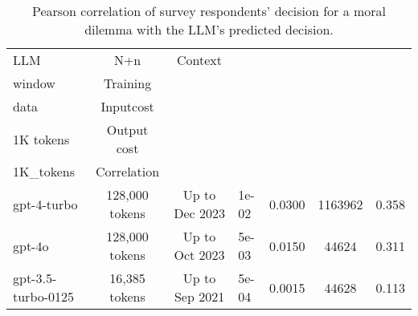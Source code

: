 \begin{table}[!h]
\centering
\caption{\label{tab:corr-tab}Pearson correlation of survey respondents' decision for a moral dilemma with the LLM's predicted decision.}
\centering
\begin{tabular}[t]{l|c|c|l|c|c|l}
\hline
LLM & N+n & Context\\ window & Training\\ data & Inputcost\\ 1K tokens & Output cost\\ 1K_tokens & Correlation\\
\hline
gpt-4-turbo & 128,000 tokens & Up to Dec 2023 & 1e-02 & 0.0300 & 1163962 & 0.358\\
\cline{1-7}
gpt-4o & 128,000 tokens & Up to Oct 2023 & 5e-03 & 0.0150 & 44624 & 0.311\\
\cline{1-7}
gpt-3.5-turbo-0125 & 16,385 tokens & Up to Sep 2021 & 5e-04 & 0.0015 & 44628 & 0.113\\
\hline
\end{tabular}
\end{table}

